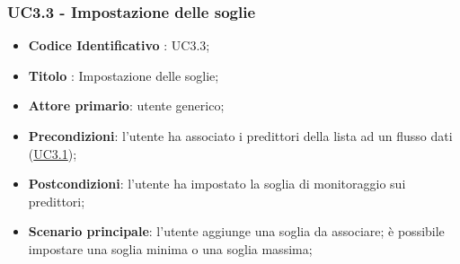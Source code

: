	\label{par:UC3.3}
	\subsubsection{UC3.3 - Impostazione delle soglie}
		\begin{itemize}
			\item\textbf{Codice Identificativo} : UC3.3;
			\item\textbf{Titolo} : Impostazione delle soglie;
			\item\textbf{Attore primario}: utente generico;
			\item\textbf{Precondizioni}: l'utente ha associato i predittori della lista ad un flusso dati (\hyperref[par:UC3.1]{UC3.1});
			\item\textbf{Postcondizioni}: l'utente ha impostato la soglia di monitoraggio sui predittori;
			\item\textbf{Scenario principale}: l'utente aggiunge una soglia da associare; è possibile impostare una soglia minima o una soglia massima;
		\end{itemize}

	\label{par:UC3.4}
